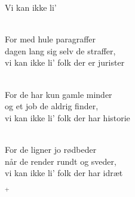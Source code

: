 \begin{song}{Vi kan ikke li'}
 \begin{SBVerse}
    \\
    For med hule paragraffer\\
    dagen lang sig selv de straffer,\\
    vi kan ikke li' folk der er jurister
  \end{SBVerse}

 \begin{SBVerse}
    \\
    For de har kun gamle minder\\
    og et job de aldrig finder,\\
    vi kan ikke li' folk der har historie
  \end{SBVerse}

 \begin{SBVerse}
    \\
    For de ligner jo rødbeder\\
    når de render rundt og sveder,\\
    vi kan ikke li' folk der har idræt
  \end{SBVerse}

 \begin{SBVerse}
    $^+$
  \end{SBVerse}
\end{song}